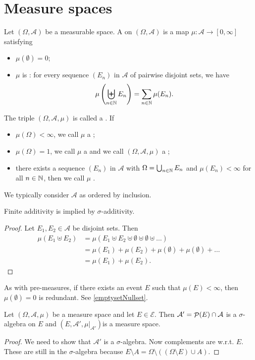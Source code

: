 \section{Measure spaces}
\begin{definition}
Let $(\Omega,\mathcal{A})$ be a measurable space. A  on $(\Omega,\mathcal{A})$ is a map $\mu: \mathcal{A} \to [0,\infty]$ satisfying
\begin{itemize}
\item $\mu(\emptyset) = 0$;
\item $\mu$ is : for every sequence $(E_n)$ in $\mathcal{A}$ of pairwise disjoint sets, we have
\[ \mu\left(\biguplus_{n\in\mathbb{N}}E_n\right) = \sum_{n\in\mathbb{N}}\mu(E_n). \]
\end{itemize}
The triple $(\Omega, \mathcal{A}, \mu)$ is called a . If
\begin{itemize}
\item $\mu(\Omega) < \infty$, we call $\mu$ a ;
\item $\mu(\Omega) = 1$, we call $\mu$ a  and we call $(\Omega, \mathcal{A}, \mu)$ a ;
\item there exists a sequence $(E_n)$ in $\mathcal{A}$ with $\Omega = \bigcup_{n\in\mathbb{N}}E_n$ and $\mu(E_n)<\infty$ for all $n\in\mathbb{N}$, then we call $\mu$ .
\end{itemize}
\end{definition}
We typically consider $\mathcal{A}$ as ordered by inclusion.

\begin{lemma}
Finite additivity is implied by $\sigma$-additivity.
\end{lemma}
\begin{proof}
Let $E_1,E_2\in\mathcal{A}$ be disjoint sets. Then
\begin{align*}
\mu(E_1\uplus E_2) &= \mu(E_1\uplus E_2 \uplus \emptyset \uplus \emptyset \uplus \ldots) \\
&= \mu(E_1) + \mu(E_2) + \mu(\emptyset) + \mu(\emptyset) + \ldots \\
&= \mu(E_1) + \mu(E_2).
\end{align*}
\end{proof}

As with pre-measures, if there exists an event $E$ such that $\mu(E)< \infty$, then $\mu(\emptyset) = 0$ is redundant. See \ref{emptysetNullset}.

\begin{lemma} \label{submeasurespace}
Let $(\Omega,\mathcal{A},\mu)$ be a measure space and let $E\in\mathcal{E}$. Then $\mathcal{A}' = \mathop{\mathcal{P}}(E)\cap\mathcal{A}$ is a $\sigma$-algebra on $E$ and $(E,\mathcal{A}',\mu|_{\mathcal{A}'})$is a measure space.
\end{lemma}
\begin{proof}
We need to show that $\mathcal{A}'$ is a $\sigma$-algebra. Now complements are w.r.t. $E$. These are still in the $\sigma$-algebra because $E\setminus A = \Omega\setminus((\Omega\setminus E)\cup A)$.
\end{proof}

